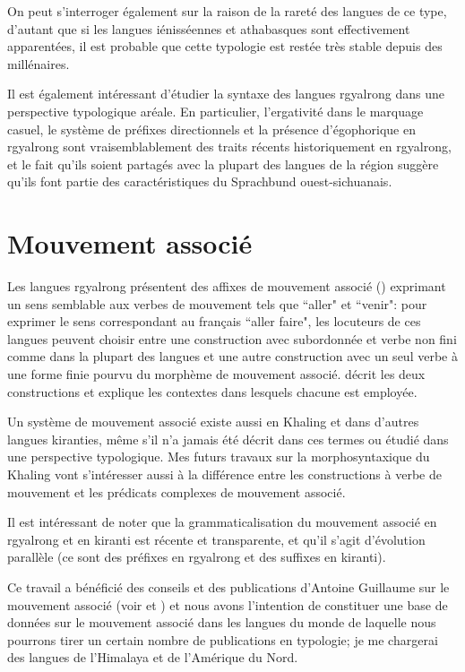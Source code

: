 \documentclass[oldfontcommands,oneside,a4paper,11pt]{memoir}
\begin{document}
On peut s'interroger également sur la raison de la rareté des langues de ce type, d'autant que si les langues iénisséennes et athabasques sont effectivement apparentées, il est probable que cette typologie est restée très stable depuis des millénaires.

 
Il est également intéressant d'étudier la syntaxe des langues rgyalrong dans une perspective typologique aréale. En particulier,  l'ergativité dans le marquage casuel, le système de préfixes directionnels  et la présence d'égophorique en rgyalrong sont vraisemblablement des traits récents historiquement en rgyalrong, et le fait qu'ils soient partagés avec la plupart des langues de la région suggère qu'ils font partie  des caractéristiques du Sprachbund ouest-sichuanais.



\section{Mouvement associé}
Les langues rgyalrong  présentent des affixes de mouvement associé (\citealt{jacques13harmonization}) exprimant un sens semblable aux verbes de mouvement tels que ``aller" et ``venir": pour exprimer le sens correspondant au français ``aller faire", les locuteurs de ces langues peuvent choisir entre une construction avec subordonnée et verbe non fini comme dans la plupart des langues et une autre construction avec un seul verbe à une forme finie pourvu du morphème de mouvement associé. \citet{jacques13harmonization} décrit les deux constructions et explique les contextes dans lesquels chacune  est employée. 

Un système de mouvement associé existe aussi en Khaling et dans d'autres langues kiranties, même s'il n'a jamais été décrit dans ces termes ou étudié dans une perspective typologique. Mes futurs travaux sur la morphosyntaxique du Khaling vont s'intéresser aussi à la différence entre les constructions à verbe de mouvement et les prédicats complexes de mouvement associé. 

Il est intéressant de noter que la grammaticalisation du mouvement associé en rgyalrong et en kiranti est récente et transparente, et qu'il s'agit d'évolution parallèle (ce sont des préfixes en rgyalrong et des suffixes en kiranti).

Ce travail a bénéficié des conseils et des publications d'Antoine Guillaume sur le mouvement associé (voir \citealt{guillaume.associated.motion} et \citealt{guillaume09mouv.assoc}) et nous avons l'intention de constituer une base de données sur le mouvement associé dans les langues du monde de laquelle nous pourrons tirer un certain nombre de publications en typologie; je me chargerai des langues de l'Himalaya et de l'Amérique du Nord.
\end{document}
